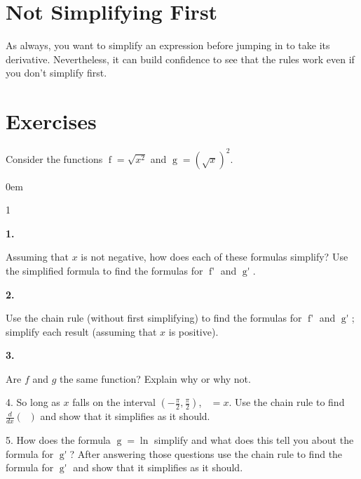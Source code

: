 \documentclass[12pt,]{book}
\theoremstyle{plain}
\theoremstyle{definition}
\numberwithin{equation}{section}
\newenvironment{exercisegroup}%
{\medskip\noindent}%
{\par\bigskip}%
\newlength{\exercisegroupindent}%
\newlength{\exercisegroupitemwidth}%
\newenvironment{exercisegrouplist}%
{\vspace{-\partopsep}%
\begin{adjustwidth}{\exercisegroupindent}{0em}}%
{\end{adjustwidth}%
\vspace{-\partopsep}%
\vspace{\baselineskip}}%
\newenvironment{exercisegroupbycol}[1]%
{\begin{exercisegrouplist}%
\vspace{-\multicolsep}%
\begin{multicols}{#1}%
\setlength{\parindent}{0em}%
\setlength{\exercisegroupitemwidth}{\linewidth}}%
{\end{multicols}%
\vspace{-\multicolsep}%
\end{exercisegrouplist}}%
\newenvironment{exercisegroupitem}[1]%
{\begin{minipage}[t]{\exercisegroupitemwidth}
\vspace{0pt}%
{\bfseries#1}%
\rule{0pt}{\baselineskip}}{\strut%
\end{minipage}%
\hspace{\columnsep}}%
\providecommand\phantomsection{}
\newcommand{\fe}[2]{\mathop{{#1}{\left(#2\right)}}}
\newcommand{\ointerval}[2]{\left(#1,#2\right)}
\newcommand{\fd}[1]{#1'}
\newcommand{\lzoo}[2]{{\frac{d}{d#1}}{\left(#2\right)}}
\begin{document}
\section[Not Simplifying First]{Not Simplifying First}\label{section-not-simplifying-first}
As always, you want to simplify an expression before jumping in to take its derivative.  Nevertheless, it can build confidence to see that the rules work even if you don't simplify first.%
\typeout{************************************************}
\typeout{************************************************}
\section*{Exercises}\label{exercises-40}

\begin{exercisegroup}%
Consider the functions \(\fe{f}{x}=\sqrt{x^2}\) and \(\fe{g}{x}=\left(\sqrt{x}\right)^2\).%
\begin{exercisegroupbycol}{1}%
\begin{exercisegroupitem}{1. }\phantomsection\hypertarget{exercise-300}{\null}
Assuming that \(x\) is not negative, how does each of these formulas simplify?  Use the simplified formula to find the formulas for \(\fe{\fd{f}}{x}\) and \(\fe{\fd{g}}{x}\).%
\end{exercisegroupitem}%
\par%
\begin{exercisegroupitem}{2. }\phantomsection\hypertarget{exercise-301}{\null}
Use the chain rule (without first simplifying) to find the formulas for \(\fe{\fd{f}}{x}\) and \(\fe{\fd{g}}{x}\); simplify each result (assuming that \(x\) is positive).%
\end{exercisegroupitem}%
\par%
\begin{exercisegroupitem}{3. }\phantomsection\hypertarget{exercise-302}{\null}
Are \(f\) and \(g\) the same function? Explain why or why not.%
\end{exercisegroupitem}%
\par%
\end{exercisegroupbycol}%
\end{exercisegroup}%
\begin{exerciselist}
\item[4.]\phantomsection\hypertarget{exercise-303}{\null}So long as \(x\) falls on the interval \(\ointerval{-\frac{\pi}{2}}{\frac{\pi}{2}}\), \(\fe{\tan^{-1}}{\fe{\tan}{x}}=x\). Use the chain rule to find \(\lzoo{x}{\fe{\tan^{-1}}{\fe{\tan}{x}}}\) and show that it simplifies as it should.%
\par\smallskip
\item[5.]\phantomsection\hypertarget{exercise-304}{\null}How does the formula \(\fe{g}{t}=\fe{\ln}{e^{5t}}\) simplify and what does this tell you about the formula for \(\fe{\fd{g}}{t}\)?  After answering those questions use the chain rule to find the formula for \(\fe{\fd{g}}{t}\) and show that it simplifies as it should.%
\par\smallskip
\end{exerciselist}
\end{document}
